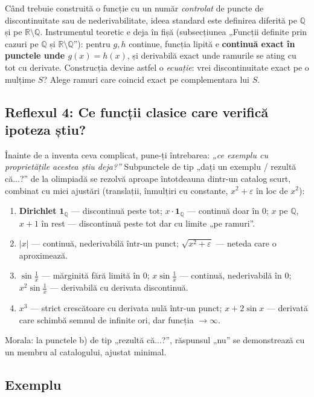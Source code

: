 Când trebuie construită o funcție cu un număr \emph{controlat} de puncte de discontinuitate sau de nederivabilitate, ideea standard este definirea diferită pe $\mathbb{Q}$ și pe $\mathbb{R}\setminus\mathbb{Q}$. Instrumentul teoretic e deja în fișă (subsecțiunea „Funcții definite prin cazuri pe $\mathbb{Q}$ și $\mathbb{R}\setminus\mathbb{Q}$''): pentru $g,h$ continue, funcția lipită e \textbf{continuă exact în punctele unde $g(x)=h(x)$}, și derivabilă exact unde ramurile se ating cu tot cu derivate. Construcția devine astfel o \emph{ecuație}: vrei discontinuitate exact pe o mulțime $S$? Alege ramuri care coincid exact pe complementara lui $S$.

\subsection{Reflexul 4: Ce funcții clasice care verifică ipoteza știu?}

Înainte de a inventa ceva complicat, pune-ți întrebarea: \emph{„ce exemplu cu proprietățile acestea știu deja?''} Subpunctele de tip „dați un exemplu / rezultă că...?'' de la olimpiadă se rezolvă aproape întotdeauna dintr-un catalog scurt, combinat cu mici ajustări (translații, înmulțiri cu constante, $x^2+\varepsilon$ în loc de $x^2$):

\begin{enumerate}[leftmargin=*, itemsep=2pt]
\item \textbf{Dirichlet} $\mathbf{1}_{\mathbb{Q}}$ --- discontinuă peste tot; $x\cdot\mathbf{1}_{\mathbb{Q}}$ --- continuă doar în $0$; $x$ pe $\mathbb{Q}$, $x+1$ în rest --- discontinuă peste tot dar cu limite „pe ramuri''.
\item $|x|$ --- continuă, nederivabilă într-un punct; $\sqrt{x^2+\varepsilon}$ --- neteda care o aproximează.
\item $\sin\frac1x$ --- mărginită fără limită în $0$; $x\sin\frac1x$ --- continuă, nederivabilă în $0$; $x^2\sin\frac1x$ --- derivabilă cu derivata discontinuă.
\item $x^3$ --- strict crescătoare cu derivata nulă într-un punct; $x+2\sin x$ --- derivată care schimbă semnul de infinite ori, dar funcția $\to\infty$.
\end{enumerate}

Morala: la punctele b) de tip „rezultă că...?'', răspunsul „nu'' se demonstrează cu un membru al catalogului, ajustat minimal.

\subsection*{Exemplu}

